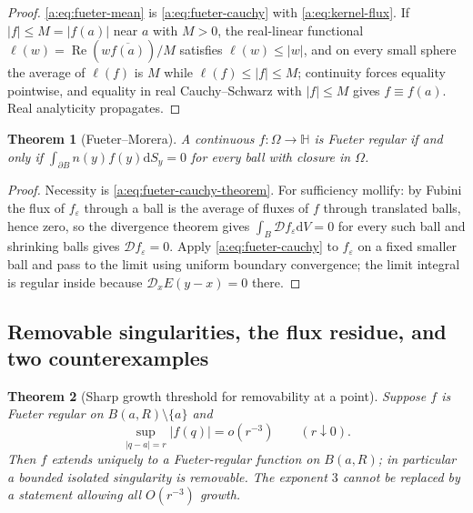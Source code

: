 \documentclass[11pt,a4paper]{article}
\numberwithin{equation}{section}
\newtheorem{theorem}{Theorem}[section]
\theoremstyle{definition}
\theoremstyle{remark}
\theoremstyle{plain}
\newcommand{\HH}{\mathbb H}
\DeclareMathOperator{\Rea}{Re}
\newcommand{\Dop}{\mathcal D}
\newcommand{\Om}{\Omega}
\newcommand{\abs}[1]{\lvert #1\rvert}
\newcommand{\dd}{\mathrm d}
\begin{document}
\begin{proof}
\eqref{a:eq:fueter-mean} is \eqref{a:eq:fueter-cauchy} with
\eqref{a:eq:kernel-flux}. If $\abs f\le M=\abs{f(a)}$ near $a$ with $M>0$, the
real-linear functional $\ell(w)=\Rea(w\overline{f(a)})/M$ satisfies
$\ell(w)\le\abs w$, and on every small sphere the average of $\ell(f)$ is $M$
while $\ell(f)\le\abs f\le M$; continuity forces equality pointwise, and
equality in real Cauchy--Schwarz with $\abs f\le M$ gives $f\equiv f(a)$.
Real analyticity propagates.
\end{proof}

\begin{theorem}[Fueter--Morera]
\label{a:thm:fueter-morera}
A continuous $f:\Om\to\HH$ is Fueter regular if and only if
$\int_{\partial B}n(y)f(y)\dd S_y=0$ for every ball with closure in $\Om$.
\end{theorem}

\begin{proof}
Necessity is \eqref{a:eq:fueter-cauchy-theorem}. For sufficiency mollify:
by Fubini the flux of $f_\varepsilon$ through a ball is the average of fluxes
of $f$ through translated balls, hence zero, so the divergence theorem gives
$\int_B\Dop f_\varepsilon\dd V=0$ for every such ball and shrinking balls
gives $\Dop f_\varepsilon=0$. Apply \eqref{a:eq:fueter-cauchy} to
$f_\varepsilon$ on a fixed smaller ball and pass to the limit using uniform
boundary convergence; the limit integral is regular inside because
$\Dop_xE(y-x)=0$ there.
\end{proof}

\subsection{Removable singularities, the flux residue, and two counterexamples}
\label{a:sec:fueter-residue}

\begin{theorem}[Sharp growth threshold for removability at a point]
\label{a:thm:fueter-removable}
Suppose $f$ is Fueter regular on $B(a,R)\setminus\{a\}$ and
\begin{equation}
 \sup_{\abs{q-a}=r}\abs{f(q)}=o(r^{-3})\qquad(r\downarrow0).
 \label{a:eq:fueter-removable-growth}
\end{equation}
Then $f$ extends uniquely to a Fueter-regular function on $B(a,R)$; in
particular a bounded isolated singularity is removable. The exponent $3$
cannot be replaced by a statement allowing all $O(r^{-3})$ growth.
\end{theorem}
\end{document}
